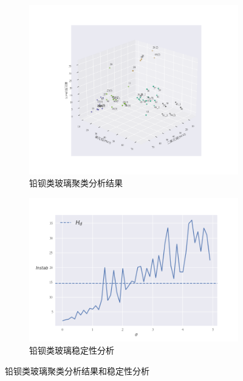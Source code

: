 \documentclass[withoutpreface,bwprint]{cumcmthesis}
\begin{document}
\begin{figure}[H]
	\centering
	\begin{subfigure}[t]{0.48\linewidth}
		\centering
		\includegraphics[width=0.9\linewidth]{铅钡类玻璃聚类分析结果.png}
		\caption{铅钡类玻璃聚类分析结果}
		\label{fig:铅钡类玻璃聚类分析结果}
		\end{subfigure}
		\begin{subfigure}[t]{0.48\linewidth}
		\centering
		\includegraphics[width=0.9\linewidth]{高钾类玻璃稳定性分析.png}
		\caption{铅钡类玻璃稳定性分析}
		\label{fig:铅钡类玻璃稳定性分析}
		\end{subfigure}
		\caption{铅钡类玻璃聚类分析结果和稳定性分析}
\end{figure}
\end{document}

